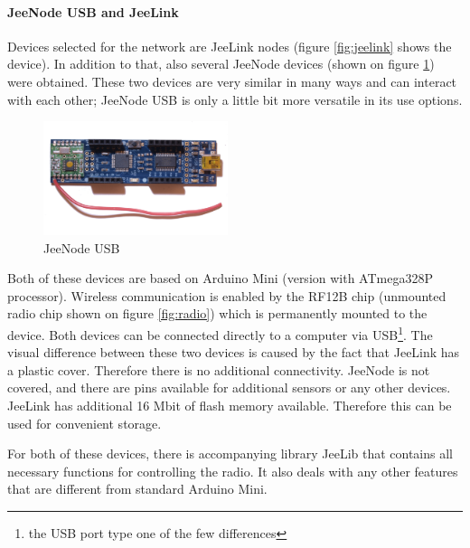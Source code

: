 \documentclass[
  print, %
  Table,   %
  nolof,     %
  nolot,     %
           oneside
]{fithesis3}
\begin{document}
\paragraph{JeeNode USB and JeeLink}\label{par:jeeLink}
Devices selected for the network are JeeLink nodes \cite{JeeLink} (figure \ref{fig:jeelink} shows the device). In addition to that, also several JeeNode devices \cite{JeeNode} (shown on figure \ref{fig:jeenode}) were obtained. These two devices are very similar in many ways and can interact with each other; JeeNode USB is only a little bit more versatile in its use options.



\begin{figure}
  \vspace{-20pt}
  \begin{center}
    \includegraphics[width=0.48\textwidth]{../images/jeenode.png}
  \end{center}
  \caption{JeeNode USB}
  \label{fig:jeenode}
\end{figure}

Both of these devices are based on Arduino Mini \cite{ArduinoMini}
(version with ATmega328P processor). Wireless communication is enabled by the RF12B chip \cite{RF12B} (unmounted radio chip shown on figure \ref{fig:radio}) which is permanently mounted to the device. Both devices can be connected directly to a computer via USB\footnote{the USB port type one of the few differences}. The visual difference between these two devices is caused by the fact that JeeLink has a plastic cover. Therefore there is no additional connectivity. JeeNode is not covered, and there are pins available for additional sensors or any other devices. JeeLink has additional 16 Mbit of flash memory \cite{JeeLink} available. Therefore this can be used for convenient storage.

For both of these devices, there is accompanying library JeeLib \cite{JeeLib} that contains all necessary functions for controlling the radio. It also deals with any other features that are different from standard Arduino Mini.
\end{document}
